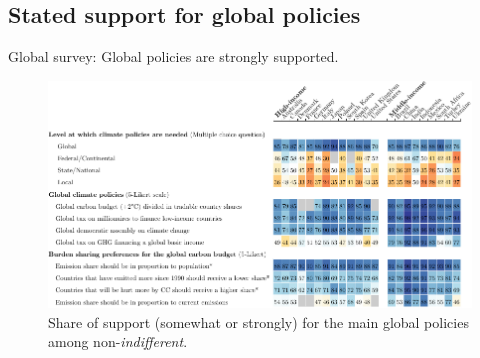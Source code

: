 \documentclass[aspectratio=169,xcolor=dvipsnames, 11pt,mathserif]{beamer}
\begin{document}
\begin{framefont}{\small}

\section{Stated support for global policies}

\begin{frame}{Global survey: Global policies are strongly supported.\label{global_policies}}
	\vspace{-.3cm}
	\begin{figure}[h!]
		\centering		
		\caption{Share of support (somewhat or strongly) for the main global policies among non-\textit{indifferent}.  \hyperlink{national_policies}{} \hyperlink{national_policies}{}%
        }
        \vspace{-.2cm}
		\includegraphics[height=.9\textheight]{../figures/OECD/Heatplot_global_tax_attitudes_share.pdf} %
		\end{figure}
\end{frame}


\end{framefont}
\end{document}
